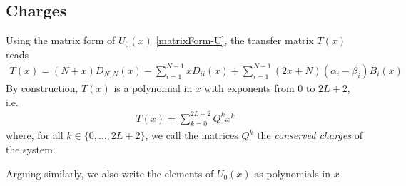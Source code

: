 \documentclass[10pt]{article}
\numberwithin{equation}{section}
\numberwithin{equation}{subsection}
\begin{document}
\subsection{Charges}
Using the matrix form of $U_{0}(x)$ \eqref{matrixForm-U}, the transfer matrix $T(x)$ reads
\begin{equation}
	\begin{split}
		T(x)=%
	(N+x)D_{N,N}(x)-\sum_{i=1}^{N-1}xD_{ii}(x)+\sum_{i=1}^{N-1}(2x+N)(\alpha_{i}-\beta_{i})B_{i}(x)
	\end{split}
\end{equation}
By construction, $T(x)$ is a polynomial in $x$ with exponents from $0$ to $2L+2$, i.e. 
\begin{equation}
	\begin{split}
		T(x)=
		\sum_{k=0}^{2L+2}Q^{k}x^{k}
	\end{split}
\end{equation}
where, for all $k\in\{0,\ldots,2L+2\}$, we call the matrices $Q^{k}$ the \textit{conserved charges} of the system. 
\begin{comment}
We also introduce 
\begin{equation}
	T_{0}(x)=(N+x)D_{N,N}(x)-\sum_{i=1}^{N-1}xD_{ii}(x)\quad\text{such that}\quad T(x)=T_{0}(x)+\sum_{i=2}^{N}(2x+N)(\alpha_{i}-\beta_{i})B_{i}(x)
\end{equation}
\end{comment}
Arguing similarly, we also write the elements of $U_{0}(x)$ as polynomials in $x$ 
\end{document}
